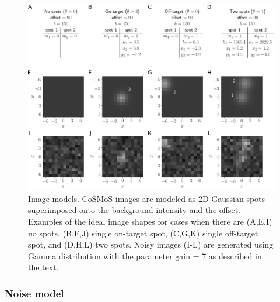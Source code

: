 \begin{figure}
\includegraphics[width=\linewidth]{figures/figure2/figure2.png}
\caption{Image models. CoSMoS images are modeled as 2D Gaussian spots superimposed onto the background intensity and the offset. Examples of the ideal image shapes for cases when there are (A,E,I) no spots, (B,F,J) single on-target spot, (C,G,K) single off-target spot, and (D,H,L) two spots. Noisy images (I-L) are generated using Gamma distribution with the parameter gain = 7 as described in the text.}
\label{fig:model}
\end{figure}

\subsubsection{Noise model}

